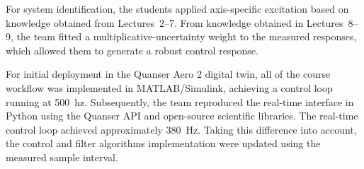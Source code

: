 \documentclass[journal]{IEEEtran}
\begin{document}

For system identification, the students applied axis-specific excitation based on knowledge obtained from
Lectures~2--7. From knowledge obtained in Lectures~8--9, the team fitted a
multiplicative-uncertainty weight to the measured responses, which allowed them to generate a robust control response. 

For initial deployment in the Quanser Aero 2 digital twin, all of the course workflow was implemented in MATLAB/Simulink, achieving a control loop running at 500~hz. Subsequently, the
team reproduced the real-time interface %
in Python using the Quanser API and open-source scientific libraries.
The real-time control loop achieved
approximately 380~Hz. Taking this difference into account, the control and filter algorithms implementation were updated using the measured sample interval.
\end{document}
